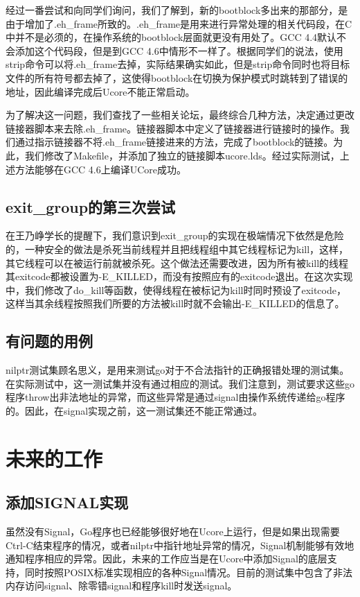 \documentclass{article}
\begin{document}
经过一番尝试和向同学们询问，我们了解到，新的bootblock多出来的那部分，是由于增加了.eh\_frame所致的。.eh\_frame是用来进行异常处理的相关代码段，在C中并不是必须的，在操作系统的bootblock层面就更没有用处了。GCC 4.4默认不会添加这个代码段，但是到GCC 4.6中情形不一样了。根据同学们的说法，使用strip命令可以将.eh\_frame去掉，实际结果确实如此，但是strip命令同时也将目标文件的所有符号都去掉了，这使得bootblock在切换为保护模式时跳转到了错误的地址，因此编译完成后Ucore不能正常启动。

为了解决这一问题，我们查找了一些相关论坛，最终综合几种方法，决定通过更改链接器脚本来去除.eh\_frame。链接器脚本中定义了链接器进行链接时的操作。我们通过指示链接器不将.eh\_frame链接进来的方法，完成了bootblock的链接。为此，我们修改了Makefile，并添加了独立的链接脚本ucore.lds。经过实际测试，上述方法能够在GCC 4.6上编译UCore成功。

\subsection{exit\_group的第三次尝试}
在王乃峥学长的提醒下，我们意识到exit\_group的实现在极端情况下依然是危险的，一种安全的做法是杀死当前线程并且把线程组中其它线程标记为kill，这样，其它线程可以在被运行前就被杀死。这个做法还需要改进，因为所有被kill的线程其exitcode都被设置为-E\_KILLED，而没有按照应有的exitcode退出。在这次实现中，我们修改了do\_kill等函数，使得线程在被标记为kill时同时预设了exitcode，这样当其余线程按照我们所要的方法被kill时就不会输出-E\_KILLED的信息了。

\subsection{有问题的用例}
nilptr测试集顾名思义，是用来测试go对于不合法指针的正确报错处理的测试集。在实际测试中，这一测试集并没有通过相应的测试。我们注意到，测试要求这些go程序throw出非法地址的异常，而这些异常是通过signal由操作系统传递给go程序的。因此，在signal实现之前，这一测试集还不能正常通过。

\section{未来的工作}

\subsection{添加SIGNAL实现}
虽然没有Signal，Go程序也已经能够很好地在Ucore上运行，但是如果出现需要Ctrl-C结束程序的情况，或者nilptr中指针地址异常的情况，Signal机制能够有效地通知程序相应的异常。因此，未来的工作应当是在Ucore中添加Signal的底层支持，同时按照POSIX标准实现相应的各种Signal情况。目前的测试集中包含了非法内存访问signal、除零错signal和程序kill时发送signal。
\end{document}
